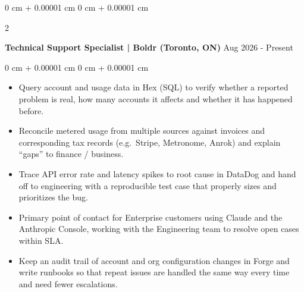 \documentclass[10pt, letterpaper]{article}
\newenvironment{highlights}{
    \begin{itemize}[
        topsep=0.10 cm,
        parsep=0.10 cm,
        partopsep=0pt,
        itemsep=0pt,
        leftmargin=0 cm + 10pt
    ]
}{
    \end{itemize}
} %
\newenvironment{onecolentry}{
    \begin{adjustwidth}{
        0 cm + 0.00001 cm
    }{
        0 cm + 0.00001 cm
    }
}{
    \end{adjustwidth}
} %
\newenvironment{twocolentry}[2][]{
    \onecolentry
    \def\secondColumn{#2}
    \setcolumnwidth{\fill, 4.5 cm}
    \begin{paracol}{2}
}{
    \switchcolumn \raggedleft \secondColumn
    \end{paracol}
    \endonecolentry
} %
\begin{document}
        \begin{twocolentry}{
            {Aug 2026 - Present}
        }
            \textbf{Technical Support Specialist | Boldr (Toronto, ON)}\end{twocolentry}
        \vspace{0.10 cm}
        \begin{onecolentry}
            \begin{highlights}
                \item Query account and usage data in Hex (SQL) to verify whether a reported problem is real, how many accounts it affects and whether it has happened before.
                \item Reconcile metered usage from multiple sources against invoices and corresponding tax records (e.g.\ Stripe, Metronome, Anrok) and explain ``gaps'' to finance / business.
                \item Trace API error rate and latency spikes to root cause in DataDog and hand off to engineering with a reproducible test case that properly sizes and prioritizes the bug.
                \item Primary point of contact for Enterprise customers using Claude and the Anthropic Console, working with the Engineering team to resolve open cases within SLA.
                \item Keep an audit trail of account and org configuration changes in Forge and write runbooks so that repeat issues are handled the same way every time and need fewer escalations.
            \end{highlights}
        \end{onecolentry}
\end{document}
